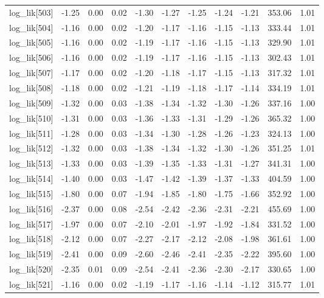 \begin{table}[ht]
\begin{tabular}{rrrrrrrrrrr}
  log\_lik[503] & -1.25 & 0.00 & 0.02 & -1.30 & -1.27 & -1.25 & -1.24 & -1.21 & 353.06 & 1.01 \\ 
  log\_lik[504] & -1.16 & 0.00 & 0.02 & -1.20 & -1.17 & -1.16 & -1.15 & -1.13 & 333.44 & 1.01 \\ 
  log\_lik[505] & -1.16 & 0.00 & 0.02 & -1.19 & -1.17 & -1.16 & -1.15 & -1.13 & 329.90 & 1.01 \\ 
  log\_lik[506] & -1.16 & 0.00 & 0.02 & -1.19 & -1.17 & -1.16 & -1.15 & -1.13 & 302.43 & 1.01 \\ 
  log\_lik[507] & -1.17 & 0.00 & 0.02 & -1.20 & -1.18 & -1.17 & -1.15 & -1.13 & 317.32 & 1.01 \\ 
  log\_lik[508] & -1.18 & 0.00 & 0.02 & -1.21 & -1.19 & -1.18 & -1.17 & -1.14 & 334.19 & 1.01 \\ 
  log\_lik[509] & -1.32 & 0.00 & 0.03 & -1.38 & -1.34 & -1.32 & -1.30 & -1.26 & 337.16 & 1.00 \\ 
  log\_lik[510] & -1.31 & 0.00 & 0.03 & -1.36 & -1.33 & -1.31 & -1.29 & -1.26 & 365.32 & 1.00 \\ 
  log\_lik[511] & -1.28 & 0.00 & 0.03 & -1.34 & -1.30 & -1.28 & -1.26 & -1.23 & 324.13 & 1.00 \\ 
  log\_lik[512] & -1.32 & 0.00 & 0.03 & -1.38 & -1.34 & -1.32 & -1.30 & -1.26 & 351.25 & 1.01 \\ 
  log\_lik[513] & -1.33 & 0.00 & 0.03 & -1.39 & -1.35 & -1.33 & -1.31 & -1.27 & 341.31 & 1.00 \\ 
  log\_lik[514] & -1.40 & 0.00 & 0.03 & -1.47 & -1.42 & -1.39 & -1.37 & -1.33 & 404.59 & 1.00 \\ 
  log\_lik[515] & -1.80 & 0.00 & 0.07 & -1.94 & -1.85 & -1.80 & -1.75 & -1.66 & 352.92 & 1.00 \\ 
  log\_lik[516] & -2.37 & 0.00 & 0.08 & -2.54 & -2.42 & -2.36 & -2.31 & -2.21 & 455.69 & 1.00 \\ 
  log\_lik[517] & -1.97 & 0.00 & 0.07 & -2.10 & -2.01 & -1.97 & -1.92 & -1.84 & 331.52 & 1.00 \\ 
  log\_lik[518] & -2.12 & 0.00 & 0.07 & -2.27 & -2.17 & -2.12 & -2.08 & -1.98 & 361.61 & 1.00 \\ 
  log\_lik[519] & -2.41 & 0.00 & 0.09 & -2.60 & -2.46 & -2.41 & -2.35 & -2.22 & 395.60 & 1.00 \\ 
  log\_lik[520] & -2.35 & 0.01 & 0.09 & -2.54 & -2.41 & -2.36 & -2.30 & -2.17 & 330.65 & 1.00 \\ 
  log\_lik[521] & -1.16 & 0.00 & 0.02 & -1.19 & -1.17 & -1.16 & -1.14 & -1.12 & 315.77 & 1.01 \\ 

\end{tabular}
\end{table}
